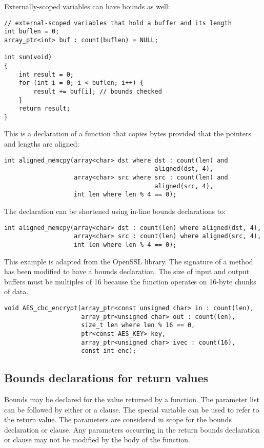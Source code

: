 Externally-scoped variables can have bounds as well:

\begin{lstlisting}
// external-scoped variables that hold a buffer and its length
int buflen = 0;
array_ptr<int> buf : count(buflen) = NULL;

int sum(void)
{
    int result = 0;
    for (int i = 0; i < buflen; i++) {
        result += buf[i]; // bounds checked
    }
    return result;
}
\end{lstlisting}

This is a declaration of a function that copies bytes provided that the
pointers and lengths are aligned:
\begin{lstlisting}
int aligned_memcpy(array<char> dst where dst : count(len) and
                                         aligned(dst, 4),
                   array<char> src where src : count(len) and
                                         aligned(src, 4),
                   int len where len % 4 == 0);
\end{lstlisting}

The declaration can be shortened using in-line bounds declarations to:

\begin{lstlisting}
int aligned_memcpy(array<char> dst : count(len) where aligned(dst, 4),
                   array<char> src : count(len) where aligned(src, 4),
                   int len where len % 4 == 0);
\end{lstlisting}

This example is adapted from the OpenSSL library. The signature of a
method has been modified to have a bounds declaration. The size of input
and output buffers must be multiples of 16 because the function operates
on 16-byte chunks of data.

\begin{lstlisting}
void AES_cbc_encrypt(array_ptr<const unsigned char> in : count(len),
                     array_ptr<unsigned char> out : count(len),
                     size_t len where len % 16 == 0,
                     ptr<const AES_KEY> key,
                     array_ptr<unsigned char> ivec : count(16),
                     const int enc);
\end{lstlisting}

\subsection{Bounds declarations for return values}

Bounds may be declared for the value returned by a function. The
parameter list can be followed by either \code{:}  or
a  clause. The special variable  can
be used to refer to the return value. The parameters are considered in
scope for the bounds declaration or  clause. Any parameters
occurring in the return bounds declaration or  clause may
not be modified by the body of the function.

